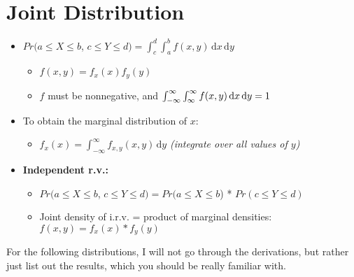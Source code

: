 \documentclass[a4paper]{article}
\begin{document}
\section{Joint Distribution}
\begin{itemize}
    \item $Pr(a \leq X \leq b$, $c \leq Y \leq d) = \int_{c}^d \int_{a}^b f(x,y) \, {\mathrm{d}}x \,{\mathrm{d}}y$
    \begin{itemize}
        \item $f(x,y) = f_x(x)f_y(y)$
        \item $f$ must be nonnegative, and $\int_{-\infty}^\infty \int_{\-\infty}^\infty f(x,y) \, {\mathrm{d}}x \,{\mathrm{d}}y = 1$
    \end{itemize}
    \item To obtain the marginal distribution of $x$:
    \begin{itemize}
        \item $f_x(x) = \int_{-\infty}^\infty f_{x,y}(x,y) \, {\mathrm{d}}y$ \textit{(integrate over all values of $y$)}
    \end{itemize}
    \item \textbf{Independent r.v.:}
    \begin{itemize}
        \item $Pr(a \leq X \leq b$, $c \leq Y \leq d) = Pr(a \leq X \leq b$) * $Pr(c \leq Y \leq d)$
        \item Joint density of i.r.v. = product of marginal densities:\\
        \indent $f(x,y) = f_x(x)*f_y(y)$
    \end{itemize}
\end{itemize}
For the following distributions, I will not go through the derivations, but rather just list out the results, which you should be really familiar with.
\end{document}
